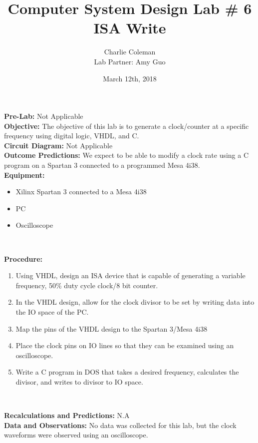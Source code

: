 \documentclass{article}
\title{Computer System Design Lab \# 6\\ISA Write}
\author{Charlie Coleman \\ Lab Partner: Amy Guo}
\date{March 12th, 2018}
\newcommand{\sect}[1]{\noindent\textbf{#1}}
\begin{document}
\maketitle
\pagebreak

\sect{Pre-Lab:} Not Applicable\\

\sect{Objective:} The objective of this lab is to generate a clock/counter at a specific frequency using digital logic, VHDL, and C.\\

\sect{Circuit Diagram:} Not Applicable \\

\sect{Outcome Predictions:} We expect to be able to modify a clock rate using a C program on a Spartan 3 connected to a programmed Mesa 4i38.\\

\sect{Equipment:}

\begin{itemize}[noitemsep, nolistsep]
	\item Xilinx Spartan 3 connected to a Mesa 4i38
	\item PC
	\item Oscilloscope
\end{itemize}~

\sect{Procedure:}

\begin{enumerate}
	\item Using VHDL, design an ISA device that is capable of generating a variable frequency, 50\% duty cycle clock/8 bit counter.
	\item In the VHDL design, allow for the clock divisor to be set by writing data into the IO space of the PC.
	\item Map the pins of the VHDL design to the Spartan 3/Mesa 4i38
	\item Place the clock pins on IO lines so that they can be examined using an oscilloscope.
	\item Write a C program in DOS that takes a desired frequency, calculates the divisor, and writes to divisor to IO space.
\end{enumerate}~

\sect{Recalculations and Predictions:} N.A\\

\sect{Data and Observations:} No data was collected for this lab, but the clock waveforms were observed using an oscilloscope.\\
\end{document}
